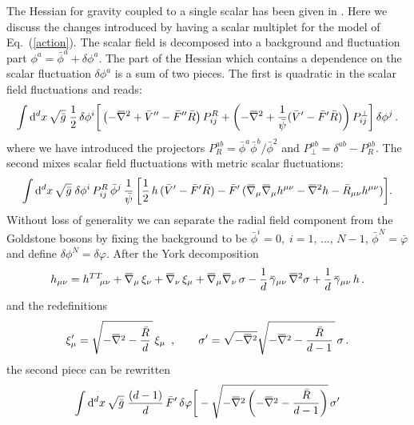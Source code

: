 \documentclass[11pt]{book} %
\newcommand{\overbar}[1]{\mkern 1.5mu\overline{\mkern-1.5mu#1\mkern-1.5mu}\mkern 1.5mu}
\newcommand{\bnabla}{\overbar \nabla}
\newcommand{\bg}{\overbar \gamma}
\newcommand{\bR}{\bar R}
\newcommand{\tth}{{h^{TT}}}
\newcommand{\bphi}{\bar\phi}
\newcommand{\rad}{\psi}
\numberwithin{equation}{chapter}
\begin{document}
{\begin{appendices}
The Hessian for gravity coupled to a single scalar has been
given in \cite{Percacci:2015wwa}.
Here we discuss the changes introduced by having a scalar multiplet for the model of Eq.~(\ref{action}).
The scalar field is decomposed into a background and
fluctuation part $\phi^a=\bar{\phi}^a+\delta\phi^a$.
The part of the Hessian which contains a dependence
on the scalar fluctuation $\delta\phi^a$ is a sum of two pieces.
The first is quadratic in the scalar field fluctuations and reads:
\begin{align}
  \int \mathrm d^d x \, \sqrt{\bar{g}} \; \frac{1}{2} \, \delta\phi^i
  \bigg[
    \left(-\bnabla^2
    +\bar V''-\bar F''\bar{R}\right) P^{R}_{ij}
    +\left(-\bnabla^2
    +\frac{1}{\bar\rad}(\bar V'-\bar F'\bar{R})\right) P^{\perp}_{ij}
  \bigg] \, \delta\phi^j \,.
\end{align}
where we have introduced the
projectors $P_R^{ab}=\bphi^a\bphi^b/\bphi^2$
and $P_\perp^{ab} =\delta^{ab}-P_R^{ab}$.
The second mixes scalar field fluctuations with metric scalar fluctuations:
\begin{align}
  \int \mathrm d^d x \, \sqrt{\bar{g}} \;
  \delta\phi^i \, P^{R}_{ij} \, \bar{\phi}^j \,
  \frac{1}{\bar\rad} \,
  \bigg[
    \frac{1}{2} \, h \, (\bar V'-\bar F'\bR)
    - \bar F' \, (\bnabla_\mu \bnabla_\mu h^{\mu\nu} - \bnabla^2 h - \bar{R}_{\mu\nu} h^{\mu\nu})
  \bigg] .
\end{align}
Without loss of generality we can separate the radial field component from the Goldstone bosons
by fixing the background to be
$\bar{\phi}^i = 0,\; i=1,\, \dots,\, N-1$, $\bar{\phi}^N = \bar{\varphi}$
and define $\delta\phi^N = \delta \varphi$.
After the York decomposition
\begin{align}
  h_{\mu\nu} = \tth_{\!\!\mu\nu}
             + \bnabla_\mu \, \xi_\nu
             + \bnabla_\nu \, \xi_\mu
             + \bnabla_\mu \bnabla_\nu \, \sigma
             - \frac{1}{d} \, \bg_{\mu\nu} \, \bnabla^2\sigma
             + \frac{1}{d} \, \bg_{\mu\nu} \, h \,.
  \label{york}
\end{align}
and the redefinitions
\begin{align}
  \xi'_\mu = \sqrt{-\bnabla^2-\frac{\bar R}{d} \, } \, \xi_\mu\ \,,\qquad
  \sigma'  = \sqrt{-\bnabla^2}\sqrt{-\bnabla^2-\frac{\bar R}{d-1} \, } \, \sigma \,.
  \label{redef}
\end{align}
the second piece can be rewritten
\begin{align}
  \int \mathrm{d}^d x \, \sqrt{\bar{g}} \;
  \frac{(d-1)}{d} \, \bar F' \, \delta\varphi
  \bigg[
    &- \sqrt{-\bnabla^2\left(-\bnabla^2-\frac{\bar{R}}{d-1}\right)} \, \sigma' \nonumber \\

\end{align}
\end{appendices}}
\end{document}
